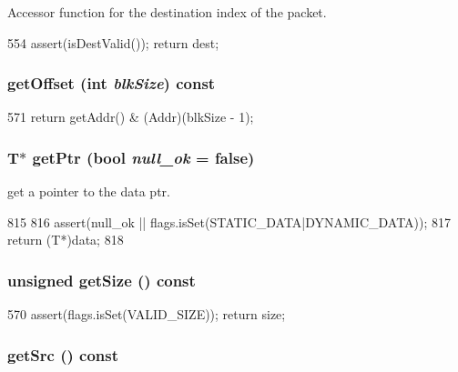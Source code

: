 Accessor function for the destination index of the packet. 


\begin{DoxyCode}
554 { assert(isDestValid()); return dest; }
\end{DoxyCode}
\hypertarget{classPacket_a8c497c6b3c41668562b2a2aa57ad098d}{
\subsubsection[{getOffset}]{ getOffset (int {\em blkSize}) const}}
\label{classPacket_a8c497c6b3c41668562b2a2aa57ad098d}



\begin{DoxyCode}
571 { return getAddr() & (Addr)(blkSize - 1); }
\end{DoxyCode}
\hypertarget{classPacket_a5c451baf3f0a89084e79e69bb9061200}{
\subsubsection[{getPtr}]{\setlength{\rightskip}{0pt plus 5cm}T$\ast$ getPtr (bool {\em null\_\-ok} = {\ttfamily false})}}
\label{classPacket_a5c451baf3f0a89084e79e69bb9061200}
get a pointer to the data ptr. 


\begin{DoxyCode}
815     {
816         assert(null_ok || flags.isSet(STATIC_DATA|DYNAMIC_DATA));
817         return (T*)data;
818     }
\end{DoxyCode}
\hypertarget{classPacket_a1d18ba49c7be427da1f4a42d53e35f48}{
\subsubsection[{getSize}]{\setlength{\rightskip}{0pt plus 5cm}unsigned getSize () const}}
\label{classPacket_a1d18ba49c7be427da1f4a42d53e35f48}



\begin{DoxyCode}
570 { assert(flags.isSet(VALID_SIZE)); return size; }
\end{DoxyCode}
\hypertarget{classPacket_a6ac1bab8f0db56da42ee3359c3aef5dc}{
\subsubsection[{getSrc}]{ getSrc () const}}
\label{classPacket_a6ac1bab8f0db56da42ee3359c3aef5dc}


